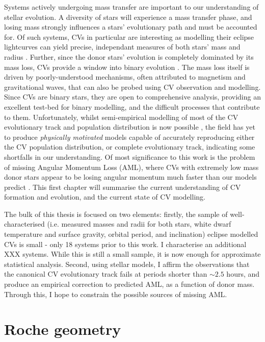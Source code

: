Systems actively undergoing mass transfer are important to our understanding of stellar evolution. A diversity of stars will experience a mass transfer phase, and losing mass strongly influences a stars' evolutionary path and must be accounted for. Of such systems, CVs in particular are interesting as modelling their eclipse lightcurves can yield precise, independant measures of both stars' mass and radius \citep{wood1986, Littlefair2008, Savoury2011}. Further, since the donor stars' evolution is completely dominated by its mass loss, CVs provide a window into binary evolution \citep{knigge2006}. The mass loss itself is driven by poorly-understood mechanisms, often attributed to magnetism and gravitational waves, that can also be probed using CV observation and modelling.
Since CVs are binary stars, they are open to comprehensive analysis, providing an excellent test-bed for binary modelling, and the difficult processes that contribute to them. Unfortunately, whilst semi-empirical modelling of most of the CV evolutionary track and population distribution is now possible \citep{Savoury2011,knigge11,Paxton_2015}, the field has yet to produce {\it physically motivated} models capable of accurately reproducing either the CV population distribution, or complete evolutionary track, indicating some shortfalls in our understanding. Of most significance to this work is the problem of missing Angular Momentum Loss (AML), where CVs with extremely low mass donor stars appear to be losing angular momentum much faster than our models predict \citep{wild2021}. This first chapter will summarise the current understanding of CV formation and evolution, and the current state of CV modelling. 

The bulk of this thesis is focused on two elements: firstly, the sample of well-characterised (i.e. measured masses and radii for both stars, white dwarf temperature and surface gravity, orbital period, and inclination) eclipse modelled CVs is small - only 18 systems prior to this work. I characterise an additional XXX systems. While this is still a small sample, it is now enough for approximate statistical analysis. Second, using stellar models, I affirm the observations \citep{knigge2006,knigge11} that the canonical CV evolutionary track fails at periods shorter than $\sim 2.5$ hours, and produce an empirical correction to predicted AML, as a function of donor mass. Through this, I hope to constrain the possible sources of missing AML. 


\section{Roche geometry}
\label{sect:introduction:Roche geometry}

